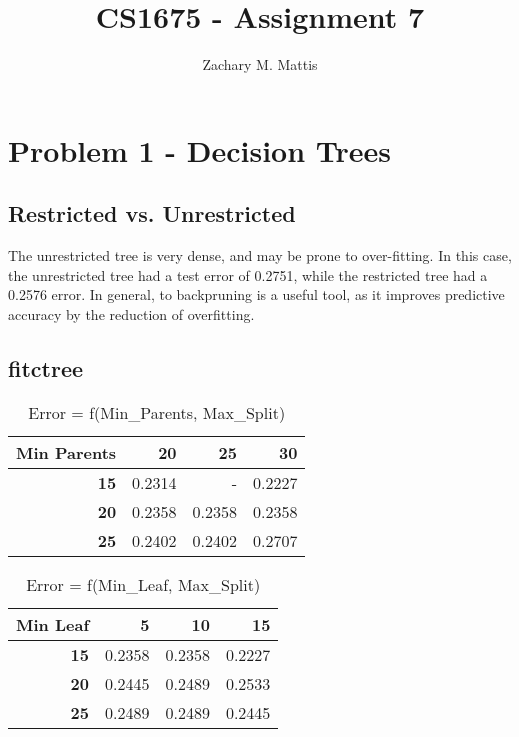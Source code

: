 \documentclass[12pt, letterpaper]{report}
\title{CS1675 - Assignment 7}
\author{Zachary M. Mattis}
\begin{document}
\maketitle

\section{Problem 1 - Decision Trees}

\subsection{Restricted vs. Unrestricted}

The unrestricted tree is very dense, and may be prone to over-fitting.  In this case, the unrestricted tree had a test error of 0.2751, while the restricted tree had a 0.2576 error.  In general, to backpruning is a useful tool, as it improves predictive accuracy by the reduction of overfitting.


\subsection{fitctree}


\begin{table}[H]
	\centering
	\begin{tabular}{ |r|r|r|r| }
		\hline
		\textbf{Min Parents} & \textbf{20} & \textbf{25} & \textbf{30} \\
		\hline
		\textbf{15} & 0.2314 & - & 0.2227 \\
		\hline
		\textbf{20} & 0.2358 & 0.2358 & 0.2358 \\
		\hline
		\textbf{25} & 0.2402 & 0.2402 & 0.2707 \\
		\hline
	\end{tabular}
	\caption{Error = f(Min\_Parents, Max\_Split)}
\end{table}


\begin{table}[H]
	\centering
	\begin{tabular}{ |r|r|r|r| }
		\hline
		\textbf{Min Leaf} & \textbf{5} & \textbf{10} & \textbf{15} \\
		\hline
		\textbf{15} & 0.2358 & 0.2358 & 0.2227 \\
		\hline
		\textbf{20} & 0.2445 & 0.2489 & 0.2533 \\
		\hline
		\textbf{25} & 0.2489 & 0.2489 & 0.2445 \\
		\hline
	\end{tabular}
	\caption{Error = f(Min\_Leaf, Max\_Split)}
\end{table}
\end{document}
